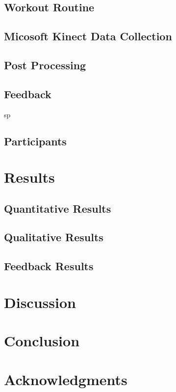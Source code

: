\documentclass{sigchi}
\begin{document}
\subsection{Workout Routine}


\subsection{Micosoft Kinect Data Collection}


\subsection{Post Processing}


\subsection{Feedback}
sp

\subsection{Participants}


\section{Results}

\subsection{Quantitative Results}


\subsection{Qualitative Results}


\subsection{Feedback Results}


\section{Discussion}


\section{Conclusion}


\section{Acknowledgments}




\end{document}
